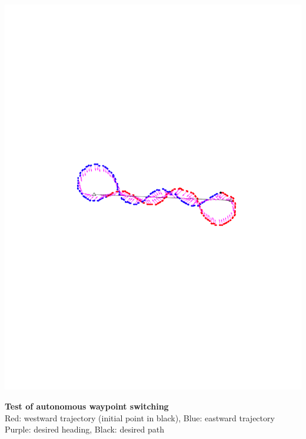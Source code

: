 \documentclass[landscape,archE]{baposter}
\begin{document}
\begin{poster}
{   \vspace{1em}
   \includegraphics[width=\textwidth,trim=2in 4.65in 1.8in 4.5in,clip=true]{images/figure2.pdf}
   \begin{center}
      \textbf{Test of autonomous waypoint switching} \\
      \small{Red: westward trajectory (initial point in black), Blue: eastward trajectory} \\
      \small{Purple: desired heading, Black: desired path} \\
   \end{center}
 }
 

\end{poster}
\end{document}
